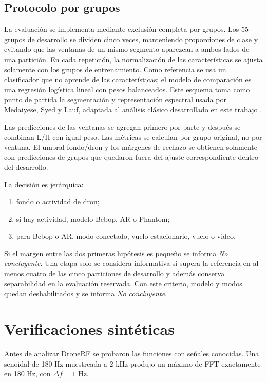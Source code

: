 \documentclass[11pt,a4paper]{article}
\begin{document}
\subsection{Protocolo por grupos}

La evaluación se implementa mediante exclusión completa por grupos. Los 55 grupos de
desarrollo se dividen cinco veces, manteniendo proporciones de clase y evitando que las
ventanas de un mismo segmento aparezcan a ambos lados de una partición. En cada repetición,
la normalización de las características se ajusta solamente con los grupos de
entrenamiento. Como referencia se usa un clasificador que no aprende de las características;
el modelo de comparación es una regresión logística lineal con pesos balanceados. Este
esquema toma como punto de partida la segmentación y representación espectral usada por
Medaiyese, Syed y Lauf, adaptada al análisis clásico desarrollado en este trabajo
\cite{medaiyese}.

Las predicciones de las ventanas se agregan primero por parte y después se combinan L/H
con igual peso. Las métricas se calculan por grupo original, no por ventana. El umbral
fondo/dron y los márgenes de rechazo se obtienen solamente con predicciones de grupos que
quedaron fuera del ajuste correspondiente dentro del desarrollo.

La decisión es jerárquica:

\begin{enumerate}
  \item fondo o actividad de dron;
  \item si hay actividad, modelo Bebop, AR o Phantom;
  \item para Bebop o AR, modo conectado, vuelo estacionario, vuelo o video.
\end{enumerate}

Si el margen entre las dos primeras hipótesis es pequeño se informa \emph{No concluyente}.
Una etapa solo se considera informativa si supera la referencia en al menos cuatro de las
cinco particiones de desarrollo y además conserva separabilidad en la evaluación reservada.
Con este criterio, modelo y modos quedan deshabilitados y se informa \emph{No concluyente}.

\section{Verificaciones sintéticas}

Antes de analizar DroneRF se probaron las funciones con señales conocidas. Una senoidal de
180 Hz muestreada a 2 kHz produjo un máximo de FFT exactamente en 180 Hz, con
$\Delta f=1$ Hz.
\end{document}

